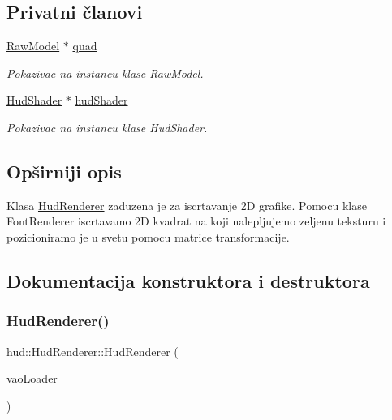 \subsection*{Privatni članovi}
\begin{DoxyCompactItemize}
\item 
\hyperlink{classmodel_1_1RawModel}{Raw\+Model} $\ast$ \hyperlink{classhud_1_1HudRenderer_a322a5afc38f922fbe0f1a6705f8b34ce}{quad}
\begin{DoxyCompactList}\small\item\em Pokazivac na instancu klase Raw\+Model. \end{DoxyCompactList}\item 
\hyperlink{classshader_1_1HudShader}{Hud\+Shader} $\ast$ \hyperlink{classhud_1_1HudRenderer_a6610c7ad17ec6cfdad6c328018030fa2}{hud\+Shader}
\begin{DoxyCompactList}\small\item\em Pokazivac na instancu klase Hud\+Shader. \end{DoxyCompactList}\end{DoxyCompactItemize}


\subsection{Opširniji opis}
Klasa \hyperlink{classhud_1_1HudRenderer}{Hud\+Renderer} zaduzena je za iscrtavanje 2D grafike. Pomocu klase Font\+Renderer iscrtavamo 2D kvadrat na koji nalepljujemo zeljenu teksturu i pozicioniramo je u svetu pomocu matrice transformacije. 

\subsection{Dokumentacija konstruktora i destruktora}
\mbox{\label{classhud_1_1HudRenderer_ae84f8293c08515d5a7b3e23632b8b6b0}} 
\subsubsection{\texorpdfstring{Hud\+Renderer()}{HudRenderer()}}
{\footnotesize\ttfamily hud\+::\+Hud\+Renderer\+::\+Hud\+Renderer (\begin{DoxyParamCaption}\item[{\hyperlink{classcore_1_1VaoLoader}{Vao\+Loader} $\ast$}]{vao\+Loader }\end{DoxyParamCaption})}



